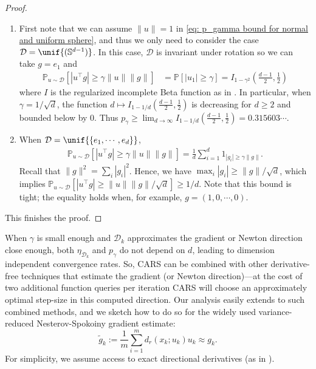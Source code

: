\begin{proof}
    \begin{enumerate}
        \item First note that we can assume $\|u\|=1$ in \eqref{eq: p_gamma bound for normal and uniform sphere}, and thus we only need to consider the case $\mathcal{D} = \unif{(\mathbb{S}^{d-1})}$.
              In this case, $\mathcal{D}$ is invariant under rotation so we can take $g = e_1$ and
              \begin{align*}
                  \mathbb{P}_{u\sim\mathcal{D}} \left[ |u^{\top}g| \geq \gamma \|u\|\|g\|\right] & = \mathbb{P}[ |u_1| \geq \gamma ]
                  = I_{1-\gamma^2}\left(\frac{d-1}{2}, \frac{1}{2} \right)
              \end{align*}
              where $I$ is the regularized incomplete Beta function as in \cite[Theorem~2.3]{cai2020scobo}.
              In particular, when $\gamma = 1/\sqrt{d}$, the function $d\mapsto I_{1-1/d}\left(\frac{d-1}{2}, \frac{1}{2} \right)$ is decreasing for $d\geq 2$ and bounded below by 0. Thus $p_{\gamma} \geq \lim_{d\rightarrow \infty} I_{1-1/d}\left(\frac{d-1}{2}, \frac{1}{2} \right) = 0.315603\cdots$.

        \item When $\mathcal{D} = \unif{\{e_1,\cdots,e_d\}}$,
              \begin{align*}
                  \mathbb{P}_{u\sim\mathcal{D}} \left[ |u^{\top}g| \geq \gamma \|u\|\|g\|\right]
                  = \frac{1}{d} \sum_{i=1}^{d} 1_{|g_i| \geq \gamma\|g\|}.
              \end{align*}
              Recall that $\|g\|^2 = \sum_{i}|g_i|^2$. Hence,  we have $\max_{i} |g_i| \geq \|g\|/\sqrt{d}$, which implies $ \mathbb{P}_{u\sim\mathcal{D}} \left[ |u^{\top}g| \geq \|u\|\|g\|/\sqrt{d}\right] \geq 1/d$. Note that this bound is tight; the equality holds when, for example, $g = (1, 0, \cdots, 0)$.
    \end{enumerate}
    \noindent This finishes the proof.
\end{proof}

When $\gamma$ is small enough and $\mathcal{D}_k$ approximates the gradient or Newton direction close enough, both $\eta_{\mathcal{D}_k}$ and $p_\gamma$ do not depend on $d$, leading to dimension independent convergence rates. So, CARS can be combined with other derivative-free techniques that estimate the gradient (or Newton direction)---at the cost of two additional function queries per iteration CARS will choose an approximately optimal step-size in this computed direction. Our analysis easily extends to such combined methods, and we sketch how to do so for the widely used \cite{nesterov2017random,salimans2017evolution,choromanski2018structured,fazel2018global} variance-reduced Nesterov-Spokoiny gradient estimate:
\begin{equation}
    \tilde{g}_k := \frac{1}{m} \sum_{i=1}^m d_r(x_k;u_k)u_k \approx g_k.
\end{equation}
For simplicity, we assume access to exact directional derivatives (as in \cite{nesterov2017random}).

